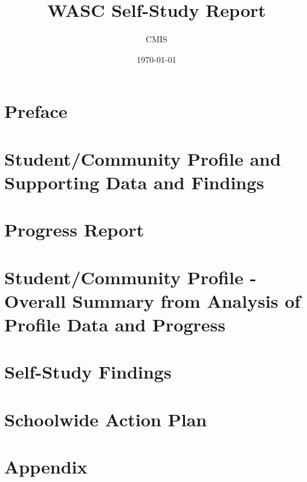 \documentclass{report}
\title{WASC Self-Study Report}
\date{\today}
\author{CMIS}
\begin{document}
\maketitle

\tableofcontents
\chapter{Preface}
\chapter[Student/Community Profile Data]{Student/Community Profile and Supporting Data and Findings}

\chapter{Progress Report}
\chapter[Student/Community Profile Summary]{Student/Community Profile - Overall Summary from Analysis of Profile Data and Progress}
\chapter{Self-Study Findings}









\chapter{Schoolwide Action Plan}
\chapter{Appendix}
\listoffigures
\listoftables
\end{document}
